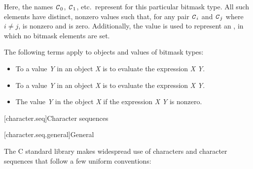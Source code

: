 \pnum
Here, the names $\texttt{\textit{C}}_0$,
$\texttt{\textit{C}}_1$, etc.\ represent
for this particular bitmask type.
%
All such elements have distinct, nonzero values such that, for any pair $\texttt{\textit{C}}_i$
and $\texttt{\textit{C}}_j$ where $i \neq j$,  is nonzero and
 is zero.
Additionally, the value  is used to represent an , in which no
bitmask elements are set.

\pnum
The following terms apply to objects and values of
bitmask types:
\begin{itemize}
\item
To 
a value \textit{Y} in an object \textit{X}
is to evaluate the expression \textit{X} \tcode{|=} \textit{Y}.
\item
To 
a value \textit{Y} in an object
\textit{X} is to evaluate the expression \textit{X} \tcode{\&= \~}\textit{Y}.
\item
The value \textit{Y}  in the object
\textit{X} if the expression \textit{X} \tcode{\&} \textit{Y} is nonzero.
\end{itemize}

[character.seq]{Character sequences}

[character.seq.general]{General}

\pnum
The C standard library makes widespread use
%
of characters and character sequences that follow a few uniform conventions:

